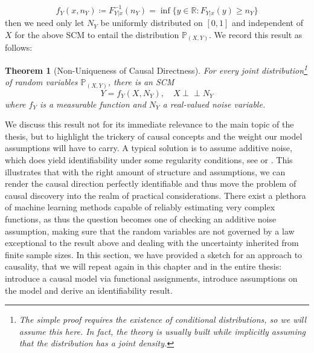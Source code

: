 \documentclass[11pt, a4paper]{memoir}
\theoremstyle{break}
\newtheorem{thm}{Theorem}
\theoremstyle{break}
\theoremstyle{nonumberplain}
\newcommand{\mR}{\mathbb{R}}
\newcommand{\mP}{\mathbb{P}}
\newcommand{\indep}{\perp \!\!\! \perp}
\begin{document}
$$f_Y(x,n_Y)\coloneqq F^{-1}_{Y|x}(n_Y)=\inf\{y\in \mR: F_{Y|x}(y)\geqslant n_Y\}$$
then we need only let $N_Y$ be uniformly distributed on $[0,1]$ and independent of $X$ for the above SCM to entail the distribution $\mP_{(X,Y)}$. We record this result as follows:
\begin{thm}[Non-Uniqueness of Causal Directness]
For every joint distribution\footnote{The simple proof requires the existence of conditional distributions, so we will assume this here. In fact, the theory is usually built while implicitly assuming that the distribution has a joint density.} of random variables $\mP_{(X,Y)}$, there is an SCM
$$Y=f_Y(X,N_Y),\quad X\indep N_Y$$
where $f_Y$ is a measurable function and $N_Y$ a real-valued noise variable.\\ \cite{Peters}
\end{thm}
We discuss this result not for its immediate relevance to the main topic of the thesis, but to highlight the trickery of causal concepts and the weight our model assumptions will have to carry. A typical solution is to assume additive noise, which does yield identifiability under some regularity conditions, see \cite{ANM1} or \cite{ANM2}. This illustrates that with the right amount of structure and assumptions, we can render the causal direction perfectly identifiable and thus move the problem of causal discovery into the realm of practical considerations. There exist a plethora of machine learning methods capable of reliably estimating very complex functions, as thus the question becomes one of checking an additive noise assumption, making sure that the random variables are not governed by a law exceptional to the result above and dealing with the uncertainty inherited from finite sample sizes. In this section, we have provided a sketch for an approach to causality, that we will repeat again in this chapter and in the entire thesis: introduce a causal model via functional assignments, introduce assumptions on the model and derive an identifiability result.
\end{document}
